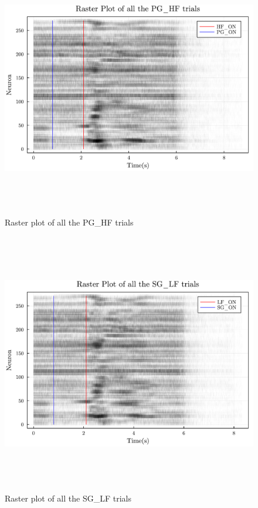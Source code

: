 \documentclass[9pt,twocolumn]{paper-template}
\begin{document}
\begin{figure}
	\centering
	\includegraphics[width=12cm,height=11.4cm]{../Assets/Q7RasterPlot2.pdf}
	\caption{Raster plot of all the PG\_HF trials}\label{fig:event_raster2}
\end{figure}

\begin{figure}
	\centering
	\includegraphics[width=12cm,height=11.4cm]{../Assets/Q7RasterPlot3.pdf}
	\caption{Raster plot of all the SG\_LF trials}\label{fig:event_raster3}
\end{figure}
\end{document}
